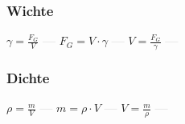 \subsubsection{Wichte} 
\begin{minipage}{0.45\textwidth} 
\end{minipage} 
\begin{minipage}{0.45\textwidth} 
 
\end{minipage} 
$ \gamma  = \frac{F_{G} }{V} $ \textcolor{lightgray}{\textbf{---}} 
$ F_{G}  = V\cdot \gamma $ \textcolor{lightgray}{\textbf{---}} 
$ V = \frac{F_{G} }{\gamma } $ \textcolor{lightgray}{\textbf{---}} 

\subsubsection{Dichte} 
\begin{minipage}{0.45\textwidth} 
\end{minipage} 
\begin{minipage}{0.45\textwidth} 
 
\end{minipage} 
$ \rho  = \frac{m}{V} $ \textcolor{lightgray}{\textbf{---}} 
$ m = \rho \cdot V $ \textcolor{lightgray}{\textbf{---}} 
$ V = \frac{m}{\rho } $ \textcolor{lightgray}{\textbf{---}} 

